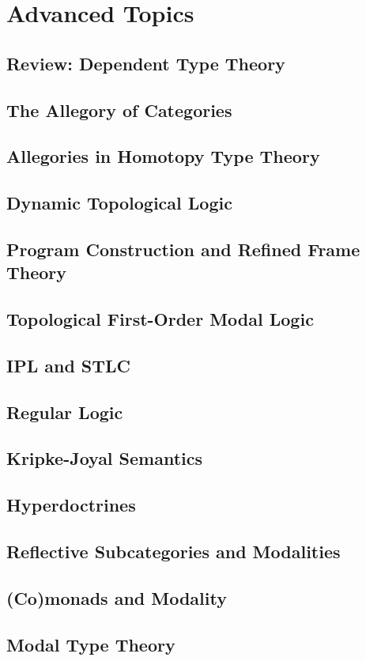 \documentclass[11pt]{book}
\begin{document}
\chapter{Advanced Topics}

\section*{Review: Dependent Type Theory}

\section{The Allegory of Categories}

\section{Allegories in Homotopy Type Theory}

\section{Dynamic Topological Logic}

\section{Program Construction and Refined Frame Theory}

\section{Topological First-Order Modal Logic}

\section{IPL and STLC}

\section{Regular Logic}

\section{Kripke-Joyal Semantics}

\section{Hyperdoctrines}

\section{Reflective Subcategories and Modalities}

\section{(Co)monads and Modality}

\section{Modal Type Theory}
\end{document}
